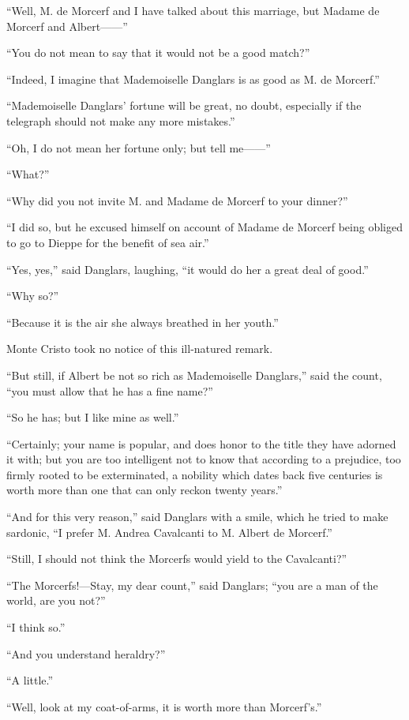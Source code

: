 “Well, M. de Morcerf and I have talked about this marriage, but Madame
de Morcerf and Albert——”

“You do not mean to say that it would not be a good match?”

“Indeed, I imagine that Mademoiselle Danglars is as good as M. de
Morcerf.”

“Mademoiselle Danglars’ fortune will be great, no doubt, especially if
the telegraph should not make any more mistakes.”

“Oh, I do not mean her fortune only; but tell me——”

“What?”

“Why did you not invite M. and Madame de Morcerf to your dinner?”

“I did so, but he excused himself on account of Madame de Morcerf being
obliged to go to Dieppe for the benefit of sea air.”

“Yes, yes,” said Danglars, laughing, “it would do her a great deal of
good.”

“Why so?”

“Because it is the air she always breathed in her youth.”

Monte Cristo took no notice of this ill-natured remark.

“But still, if Albert be not so rich as Mademoiselle Danglars,” said
the count, “you must allow that he has a fine name?”

“So he has; but I like mine as well.”

“Certainly; your name is popular, and does honor to the title they have
adorned it with; but you are too intelligent not to know that according
to a prejudice, too firmly rooted to be exterminated, a nobility which
dates back five centuries is worth more than one that can only reckon
twenty years.”

“And for this very reason,” said Danglars with a smile, which he tried
to make sardonic, “I prefer M. Andrea Cavalcanti to M. Albert de
Morcerf.”

“Still, I should not think the Morcerfs would yield to the Cavalcanti?”

“The Morcerfs!—Stay, my dear count,” said Danglars; “you are a man of
the world, are you not?”

“I think so.”

“And you understand heraldry?”

“A little.”

“Well, look at my coat-of-arms, it is worth more than Morcerf’s.”

